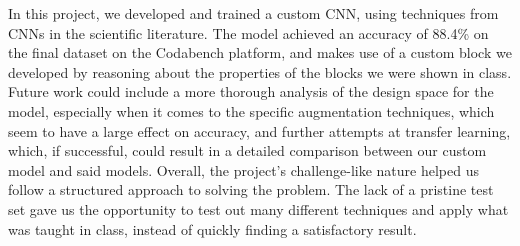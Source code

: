 \documentclass[11pt]{article}
\begin{document}
\begin{multicols}{2}
      In this project, we developed and trained a custom CNN, using techniques from CNNs in the scientific literature. The model achieved an accuracy of 88.4\% on the final dataset on the Codabench platform, and makes use of a custom block we developed by reasoning about the properties of the blocks we were shown in class. Future work could include a more thorough analysis of the design space for the model, especially when it comes to the specific augmentation techniques, which seem to have a large effect on accuracy, and further attempts at transfer learning, which, if successful, could result in a detailed comparison between our custom model and said models. Overall, the project's challenge-like nature helped us follow a structured approach to solving the problem. The lack of a pristine test set gave us the opportunity to test out many different techniques and apply what was taught in class, instead of quickly finding a satisfactory result. 

      
      

\end{multicols}
\end{document}
